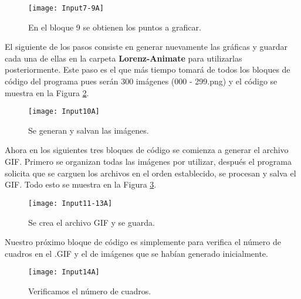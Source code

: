 \begin{figure}[h!]
	\begin{center}
		\texttt{[image: Input7-9A]}
        \caption{En el bloque 9 se obtienen los puntos a graficar.}
        \label{fig15:TresBloques}
	\end{center}
\end{figure}

\vfill
\vline
\space
\par \vspace{1cm}

El siguiente de los pasos consiste en generar nuevamente las gráficas y guardar cada una de ellas en la carpeta \textbf{Lorenz-Animate} para utilizarlas posteriormente. Este paso es el que más tiempo tomará de todos los bloques de código del programa pues serán 300 imágenes (000 - 299.png) y el código se muestra en la Figura \ref{fig16:GuardarImagen}. \\

\begin{figure}[h!]
	\begin{center}
		\texttt{[image: Input10A]}
        \caption{Se generan y salvan las imágenes.}
        \label{fig16:GuardarImagen}
	\end{center}
\end{figure}

Ahora en los siguientes tres bloques de código se comienza a generar el archivo GIF. Primero se organizan todas las imágenes por utilizar, después el programa solicita que se carguen los archivos en el orden establecido, se procesan y salva el GIF. Todo esto se muestra en la Figura \ref{fig17:CompilaGIF}. \\

\begin{figure}[h!]
	\begin{center}
		\texttt{[image: Input11-13A]}
        \caption{Se crea el archivo GIF y se guarda.}
        \label{fig17:CompilaGIF}
	\end{center}
\end{figure}

Nuestro próximo bloque de código es simplemente para verifica el número de cuadros en el .GIF y el de imágenes que se habían generado inicialmente.

\begin{figure}[h!]
	\begin{center}
		\texttt{[image: Input14A]}
        \caption{Verificamos el número de cuadros.}
        \label{fig18:VerificaCuadros}
	\end{center}
\end{figure}

